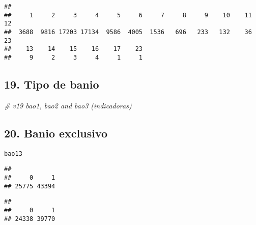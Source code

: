 \documentclass[11pt,]{article}
\newenvironment{Shaded}{\begin{snugshade}}{\end{snugshade}}
\newcommand{\KeywordTok}[1]{\textcolor[rgb]{0.13,0.29,0.53}{\textbf{#1}}}
\newcommand{\DataTypeTok}[1]{\textcolor[rgb]{0.13,0.29,0.53}{#1}}
\newcommand{\StringTok}[1]{\textcolor[rgb]{0.31,0.60,0.02}{#1}}
\newcommand{\CommentTok}[1]{\textcolor[rgb]{0.56,0.35,0.01}{\textit{#1}}}
\newcommand{\OperatorTok}[1]{\textcolor[rgb]{0.81,0.36,0.00}{\textbf{#1}}}
\newcommand{\NormalTok}[1]{#1}
\begin{document}
\begin{verbatim}
## 
##     1     2     3     4     5     6     7     8     9    10    11    12 
##  3688  9816 17203 17134  9586  4005  1536   696   233   132    36    23 
##    13    14    15    16    17    23 
##     9     2     3     4     1     1
\end{verbatim}

\subsection{19. Tipo de banio}\label{tipo-de-banio}

\begin{Shaded}
\begin{Highlighting}[]
\CommentTok{# v19 bao1, bao2 and bao3 (indicadoras)}
\end{Highlighting}
\end{Shaded}

\subsection{20. Banio exclusivo}\label{banio-exclusivo}

\texttt{bao13}

\begin{Shaded}
\end{Shaded}

\begin{verbatim}
## 
##     0     1 
## 25775 43394
\end{verbatim}

\begin{Shaded}
\end{Shaded}

\begin{verbatim}
## 
##     0     1 
## 24338 39770
\end{verbatim}
\end{document}
